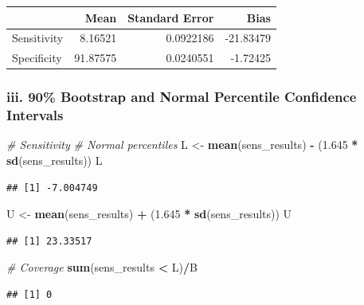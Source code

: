 \documentclass[]{article}
\newenvironment{Shaded}{\begin{snugshade}}{\end{snugshade}}
\newcommand{\CommentTok}[1]{\textcolor[rgb]{0.56,0.35,0.01}{\textit{#1}}}
\newcommand{\FloatTok}[1]{\textcolor[rgb]{0.00,0.00,0.81}{#1}}
\newcommand{\KeywordTok}[1]{\textcolor[rgb]{0.13,0.29,0.53}{\textbf{#1}}}
\newcommand{\NormalTok}[1]{#1}
\newcommand{\OperatorTok}[1]{\textcolor[rgb]{0.81,0.36,0.00}{\textbf{#1}}}
\newcommand{\StringTok}[1]{\textcolor[rgb]{0.31,0.60,0.02}{#1}}
\begin{document}
\begin{longtable}[]{@{}lrrr@{}}
\toprule
& Mean & Standard Error & Bias\tabularnewline
\midrule
\endhead
Sensitivity & 8.16521 & 0.0922186 & -21.83479\tabularnewline
Specificity & 91.87575 & 0.0240551 & -1.72425\tabularnewline
\bottomrule
\end{longtable}

\hypertarget{iii.-90-bootstrap-and-normal-percentile-confidence-intervals}{%
\subsubsection{iii. 90\% Bootstrap and Normal Percentile Confidence
Intervals}\label{iii.-90-bootstrap-and-normal-percentile-confidence-intervals}}

\begin{Shaded}
\begin{Highlighting}[]
\CommentTok{# Sensitivity}
\CommentTok{# Normal percentiles}
\NormalTok{L <-}\StringTok{ }\KeywordTok{mean}\NormalTok{(sens_results) }\OperatorTok{-}\StringTok{ }\NormalTok{(}\FloatTok{1.645} \OperatorTok{*}\StringTok{ }\KeywordTok{sd}\NormalTok{(sens_results))}
\NormalTok{L}
\end{Highlighting}
\end{Shaded}

\begin{verbatim}
## [1] -7.004749
\end{verbatim}

\begin{Shaded}
\begin{Highlighting}[]
\NormalTok{U <-}\StringTok{ }\KeywordTok{mean}\NormalTok{(sens_results) }\OperatorTok{+}\StringTok{ }\NormalTok{(}\FloatTok{1.645} \OperatorTok{*}\StringTok{ }\KeywordTok{sd}\NormalTok{(sens_results))}
\NormalTok{U}
\end{Highlighting}
\end{Shaded}

\begin{verbatim}
## [1] 23.33517
\end{verbatim}

\begin{Shaded}
\begin{Highlighting}[]
\CommentTok{# Coverage}
\KeywordTok{sum}\NormalTok{(sens_results }\OperatorTok{<}\StringTok{ }\NormalTok{L)}\OperatorTok{/}\NormalTok{B}
\end{Highlighting}
\end{Shaded}

\begin{verbatim}
## [1] 0
\end{verbatim}
\end{document}
